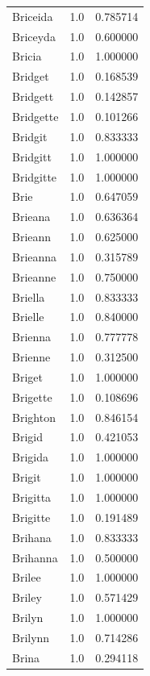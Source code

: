 \documentclass[
  letterpaper,
  DIV=11,
  numbers=noendperiod]{scrreprt}
\begin{document}
\begin{tabular}{lrr}
Briceida        &   1.0 &   0.785714 \\
Briceyda        &   1.0 &   0.600000 \\
Bricia          &   1.0 &   1.000000 \\
Bridget         &   1.0 &   0.168539 \\
Bridgett        &   1.0 &   0.142857 \\
Bridgette       &   1.0 &   0.101266 \\
Bridgit         &   1.0 &   0.833333 \\
Bridgitt        &   1.0 &   1.000000 \\
Bridgitte       &   1.0 &   1.000000 \\
Brie            &   1.0 &   0.647059 \\
Brieana         &   1.0 &   0.636364 \\
Brieann         &   1.0 &   0.625000 \\
Brieanna        &   1.0 &   0.315789 \\
Brieanne        &   1.0 &   0.750000 \\
Briella         &   1.0 &   0.833333 \\
Brielle         &   1.0 &   0.840000 \\
Brienna         &   1.0 &   0.777778 \\
Brienne         &   1.0 &   0.312500 \\
Briget          &   1.0 &   1.000000 \\
Brigette        &   1.0 &   0.108696 \\
Brighton        &   1.0 &   0.846154 \\
Brigid          &   1.0 &   0.421053 \\
Brigida         &   1.0 &   1.000000 \\
Brigit          &   1.0 &   1.000000 \\
Brigitta        &   1.0 &   1.000000 \\
Brigitte        &   1.0 &   0.191489 \\
Brihana         &   1.0 &   0.833333 \\
Brihanna        &   1.0 &   0.500000 \\
Brilee          &   1.0 &   1.000000 \\
Briley          &   1.0 &   0.571429 \\
Brilyn          &   1.0 &   1.000000 \\
Brilynn         &   1.0 &   0.714286 \\
Brina           &   1.0 &   0.294118 \\

\end{tabular}
\end{document}
